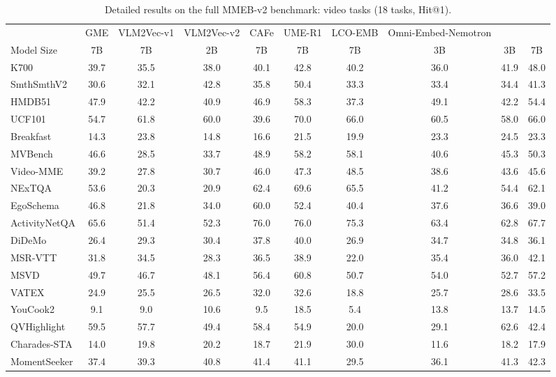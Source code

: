 \begin{table}[!t]
    \centering
\caption{Detailed results on the full MMEB-v2 benchmark: video tasks (18 tasks, Hit@1).}
\label{tab:full_score_video}
    \renewcommand{\arraystretch}{1.1}
    \begin{adjustbox}{width=\textwidth}
    \begin{tabular}{l|ccccccccc}
        \toprule
        ~ & GME & VLM2Vec-v1 & VLM2Vec-v2 & CAFe & UME-R1 & LCO-EMB & Omni-Embed-Nemotron & \ours{} & \ours{} \\
        Model Size & 7B & 7B & 2B & 7B & 7B & 7B & 3B & 3B & 7B \\
        \midrule
        K700 & 39.7 & 35.5 & 38.0 & 40.1 & 42.8 & 40.2 & 36.0 & 41.9 & 48.0 \\
        SmthSmthV2 & 30.6 & 32.1 & 42.8 & 35.8 & 50.4 & 33.3 & 33.4 & 34.4 & 41.3 \\
        HMDB51 & 47.9 & 42.2 & 40.9 & 46.9 & 58.3 & 37.3 & 49.1 & 42.2 & 54.4 \\
        UCF101 & 54.7 & 61.8 & 60.0 & 39.6 & 70.0 & 66.0 & 60.5 & 58.0 & 66.0 \\
        Breakfast & 14.3 & 23.8 & 14.8 & 16.6 & 21.5 & 19.9 & 23.3 & 24.5 & 23.3 \\
        MVBench & 46.6 & 28.5 & 33.7 & 48.9 & 58.2 & 58.1 & 40.6 & 45.3 & 50.3 \\
        Video-MME & 39.2 & 27.8 & 30.7 & 46.0 & 47.3 & 48.5 & 38.6 & 43.6 & 45.6 \\
        NExTQA & 53.6 & 20.3 & 20.9 & 62.4 & 69.6 & 65.5 & 41.2 & 54.4 & 62.1 \\
        EgoSchema & 46.8 & 21.8 & 34.0 & 60.0 & 52.4 & 40.4 & 37.6 & 36.6 & 39.0 \\
        ActivityNetQA & 65.6 & 51.4 & 52.3 & 76.0 & 76.0 & 75.3 & 63.4 & 62.8 & 67.7 \\
        DiDeMo & 26.4 & 29.3 & 30.4 & 37.8 & 40.0 & 26.9 & 34.7 & 34.8 & 36.1 \\
        MSR-VTT & 31.8 & 34.5 & 28.3 & 36.5 & 38.9 & 22.0 & 35.4 & 36.0 & 42.1 \\
        MSVD & 49.7 & 46.7 & 48.1 & 56.4 & 60.8 & 50.7 & 54.0 & 52.7 & 57.2 \\
        VATEX & 24.9 & 25.5 & 26.5 & 32.0 & 32.6 & 18.8 & 25.7 & 28.6 & 33.5 \\
        YouCook2 & 9.1 & 9.0 & 10.6 & 9.5 & 18.5 & 5.4 & 13.8 & 13.7 & 14.5 \\
        QVHighlight & 59.5 & 57.7 & 49.4 & 58.4 & 54.9 & 20.0 & 29.1 & 62.6 & 42.4 \\
        Charades-STA & 14.0 & 19.8 & 20.2 & 18.7 & 21.9 & 30.0 & 11.6 & 18.2 & 17.9 \\
        MomentSeeker & 37.4 & 39.3 & 40.8 & 41.4 & 41.1 & 29.5 & 36.1 & 41.3 & 42.3 \\
        \bottomrule
    \end{tabular}
    \end{adjustbox}
\end{table}

